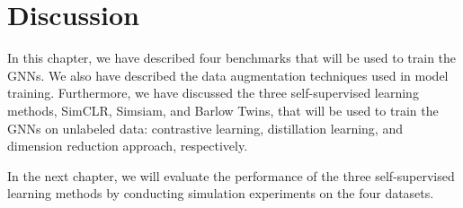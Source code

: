 \section{Discussion}

In this chapter, we have described four benchmarks that will be used to train the GNNs. We also have described the data augmentation techniques used in model training. Furthermore, we have discussed the three self-supervised learning methods, SimCLR, Simsiam, and Barlow Twins, that will be used to train the GNNs on unlabeled data: contrastive learning, distillation learning, and dimension reduction approach, respectively. 

In the next chapter, we will evaluate the performance of the three self-supervised learning methods by conducting simulation experiments on the four datasets.
